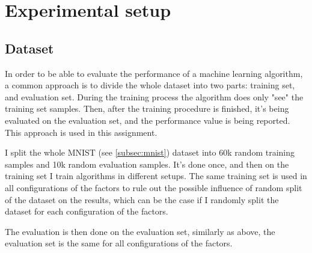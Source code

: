 \documentclass{article}
\begin{document}
\section{Experimental setup}

\subsection{Dataset}
\label{subsec:dataset}
In order to be able to evaluate the performance of a machine learning algorithm, a common approach is to divide the whole dataset into two parts: training set, and evaluation set. During the training process the algorithm does only "see" the training set samples. Then, after the training procedure is finished, it's being evaluated on the evaluation set, and the performance value is being reported. This approach is used in this assignment.

I split the whole MNIST (see \ref{subsec:mnist}) dataset into 60k random training samples and 10k random evaluation samples. It's done once, and then on the training set I train algorithms in different setups. The same training set is used in all configurations of the factors to rule out the possible influence of random split of the dataset on the results, which can be the case if I randomly split the dataset for each configuration of the factors.

The evaluation is then done on the evaluation set, similarly as above, the evaluation set is the same for all configurations of the factors.
\end{document}
